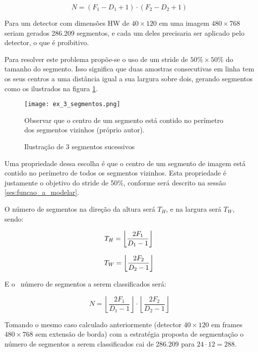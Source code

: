 \begin{equation}
	N = (F_1 - D_1 + 1) \cdot (F_2 - D_2 + 1)
\end{equation}

Para um detector com dimensões HW de $40 \times 120$ em uma imagem
$480 \times 768$ seriam gerados 286.209 segmentos, e cada um deles precisaria
ser aplicado pelo detector, o que é proibitivo.

Para resolver este problema propõe-se o uso de um stride de
$50\% \times 50\%$ do tamanho do segmento. Isso significa que duas amostras
consecutivas em linha tem os seus centros a uma distância igual a sua
largura sobre dois, gerando segmentos como os ilustrados na figura
\ref{fig:ex_3_segmentos}.

\begin{figure}[!htb]
	\centering
	\texttt{[image: ex\_3\_segmentos.png]}
	\caption{Ilustração de 3 segmentos sucessivos}
	\label{fig:ex_3_segmentos}
	Observar que o centro de um segmento está contido no perímetro dos
	segmentos vizinhos (próprio autor).
\end{figure}

Uma propriedade dessa escolha é que o centro de um segmento de imagem está
contido no perímetro de todos os segmentos vizinhos. Esta propriedade é
justamente o objetivo do stride de 50\%, conforme será descrito na sessão
\ref{ses:funcao_a_modelar}.

O número de segmentos na direção da altura será $T_H$, e na largura será
$T_W$, sendo:

\begin{equation}
	T_H=\left\lfloor \frac{2F_1}{D_1-1} \right\rfloor \\
\end{equation}

\begin{equation}
	T_W=\left\lfloor \frac{2F_2}{D_2-1} \right\rfloor \\
\end{equation}

E o  número de segmentos a serem classificados será:

\begin{equation}
	N=\left\lfloor \frac{2F_1}{D_1-1} \right\rfloor \cdot
		\left\lfloor \frac{2F_2}{D_2-1} \right\rfloor
\end{equation}

Tomando o mesmo caso calculado anteriormente (detector $40 \times 120$ em
frames $480 \times 768$ sem extensão de borda) com a estratégia proposta
de segmentação o número de segmentos a serem classificados cai de 286.209
para $24 \cdot 12=288$.

